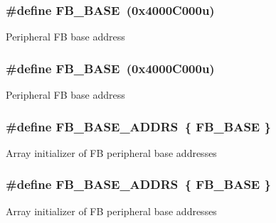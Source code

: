 \subsubsection[{\texorpdfstring{F\+B\+\_\+\+B\+A\+SE}{FB_BASE}}]{\setlength{\rightskip}{0pt plus 5cm}\#define F\+B\+\_\+\+B\+A\+SE~(0x4000\+C000u)}\hypertarget{group__FB__Peripheral__Access__Layer_ga0d4d1f953f53702b3ffbbc10fb7ec30d}{}\label{group__FB__Peripheral__Access__Layer_ga0d4d1f953f53702b3ffbbc10fb7ec30d}
Peripheral FB base address 
\subsubsection[{\texorpdfstring{F\+B\+\_\+\+B\+A\+SE}{FB_BASE}}]{\setlength{\rightskip}{0pt plus 5cm}\#define F\+B\+\_\+\+B\+A\+SE~(0x4000\+C000u)}\hypertarget{group__FB__Peripheral__Access__Layer_ga0d4d1f953f53702b3ffbbc10fb7ec30d}{}\label{group__FB__Peripheral__Access__Layer_ga0d4d1f953f53702b3ffbbc10fb7ec30d}
Peripheral FB base address 
\subsubsection[{\texorpdfstring{F\+B\+\_\+\+B\+A\+S\+E\+\_\+\+A\+D\+D\+RS}{FB_BASE_ADDRS}}]{\setlength{\rightskip}{0pt plus 5cm}\#define F\+B\+\_\+\+B\+A\+S\+E\+\_\+\+A\+D\+D\+RS~\{ {\bf F\+B\+\_\+\+B\+A\+SE} \}}\hypertarget{group__FB__Peripheral__Access__Layer_gaaf7a0f4fce443d227db43982f175a3fb}{}\label{group__FB__Peripheral__Access__Layer_gaaf7a0f4fce443d227db43982f175a3fb}
Array initializer of FB peripheral base addresses 
\subsubsection[{\texorpdfstring{F\+B\+\_\+\+B\+A\+S\+E\+\_\+\+A\+D\+D\+RS}{FB_BASE_ADDRS}}]{\setlength{\rightskip}{0pt plus 5cm}\#define F\+B\+\_\+\+B\+A\+S\+E\+\_\+\+A\+D\+D\+RS~\{ {\bf F\+B\+\_\+\+B\+A\+SE} \}}\hypertarget{group__FB__Peripheral__Access__Layer_gaaf7a0f4fce443d227db43982f175a3fb}{}\label{group__FB__Peripheral__Access__Layer_gaaf7a0f4fce443d227db43982f175a3fb}
Array initializer of FB peripheral base addresses 
